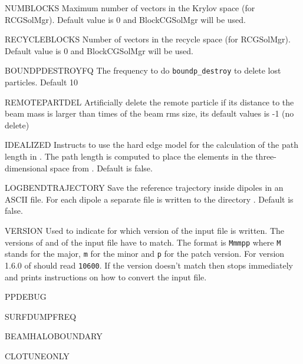 \begin{kdescription}
  \item[NUMBLOCKS]
  Maximum number of vectors in the Krylov space (for RCGSolMgr). Default value is 0 and BlockCGSolMgr will be used.

  \item[RECYCLEBLOCKS]
  Number of vectors in the recycle space (for RCGSolMgr). Default value is 0 and BlockCGSolMgr will be used.

  \item[BOUNDPDESTROYFQ]
  The frequency to do \texttt{boundp\_destroy} to delete lost particles. Default 10

  \item[REMOTEPARTDEL]
 \sloppy Artificially delete the remote particle if its distance to the beam mass is larger than  times of the beam rms size, its default values is -1 (no delete)

  \item[IDEALIZED]
  Instructs to use the hard edge model for the calculation of the path length in \opalt. The path length is computed to place the elements in the three-dimensional space from . Default is false.

  \item[LOGBENDTRAJECTORY]
  Save the reference trajectory inside dipoles in an ASCII file. For each dipole a separate file is written to the directory . Default is false.

  \item[VERSION]
  Used to indicate for which version of \opal the input file is written. The versions of \opal and of the input file have to match. The format is \texttt{Mmmpp} where \texttt{M} stands for the major, \texttt{m} for the minor and \texttt{p} for the patch version. For version 1.6.0 of \opal {} should read \texttt{10600}. If the version doesn't match then \opal stops immediately and prints instructions on how to convert the input file.

  \item[PPDEBUG]

  \item[SURFDUMPFREQ]

  \item[BEAMHALOBOUNDARY]

  \item[CLOTUNEONLY]
\end{kdescription}


